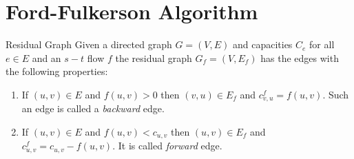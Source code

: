 \begin{Example}{}{}
\begin{center}
\end{center}
\end{Example}


\section{Ford-Fulkerson Algorithm}
\begin{Definition}{Residual Graph}{}
	Given a directed graph $G=(V,E)$ and capacities $C_e$ for all $e\in E$ and an $s-t$ flow $f$ the residual graph $G_f=(V,E_f)$ has the edges with the following properties:
	\begin{enumerate}[label=\protect\circled{\arabic*}]
		\item If $(u,v)\in E$ and $f(u,v)>0$  then $(v,u)\in E_f$ and $c_{v,u}^f=f(u,v)$. Such an edge is called a \textit{backward} edge.
		\item If $(u,v)\in E$ and $f(u,v)<c_{u,v}$ then $(u,v)\in E_f$ and $c_{u,v}^f=c_{u,v}-f(u,v)$. It is called \textit{forward} edge.
	\end{enumerate}
\end{Definition}

